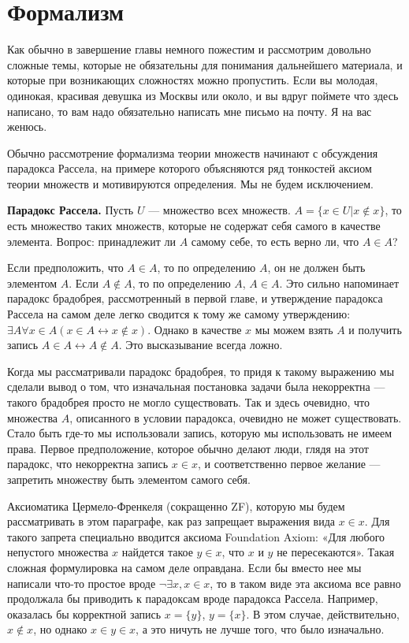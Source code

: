 \section{Формализм}

Как обычно в завершение главы немного пожестим и рассмотрим довольно сложные темы, которые не обязательны для понимания дальнейшего материала, и которые при возникающих сложностях можно пропустить. Если вы молодая, одинокая, красивая девушка из Москвы или около, и вы вдруг поймете что здесь написано, то вам надо обязательно написать мне письмо на почту. Я на вас женюсь.

Обычно рассмотрение формализма теории множеств начинают с обсуждения парадокса Рассела, на примере которого объясняются ряд тонкостей аксиом теории множеств и мотивируются определения. Мы не будем исключением.

{\bfseries Парадокс Рассела.} Пусть $U$ — множество всех множеств. $A = \{x\in U|x\not\in x\}$, то есть множество таких множеств, которые не содержат себя самого в качестве элемента. Вопрос: принадлежит ли $A$ самому себе, то есть верно ли, что $A\in A$?

Если предположить, что $A\in A$, то по определению $A$, он не должен быть элементом $A$. Если $A\not\in A$, то по определению $A$, $A \in A$. Это сильно напоминает парадокс брадобрея, рассмотренный в первой главе, и утверждение парадокса Рассела на самом деле легко сводится к тому же самому утверждению: $\exists A\forall x\in A (x\in A \leftrightarrow x\not\in x)$. Однако в качестве $x$ мы можем взять $A$ и получить запись $A\in A \leftrightarrow A\not\in A$. Это высказывание всегда ложно.

Когда мы рассматривали парадокс брадобрея, то придя к такому выражению мы сделали вывод о том, что изначальная постановка задачи была некорректна — такого брадобрея просто не могло существовать. Так и здесь очевидно, что множества $A$, описанного в условии парадокса, очевидно не может существовать. Стало быть где-то мы использовали запись, которую мы использовать не имеем права. Первое предположение, которое обычно делают люди, глядя на этот парадокс, что некорректна запись $x\in x$, и соответственно первое желание — запретить множеству быть элементом самого себя.

Аксиоматика Цермело-Френкеля (сокращенно ZF), которую мы будем рассматривать в этом параграфе, как раз запрещает выражения вида $x\in x$. Для такого запрета специально вводится аксиома Foundation Axiom: «Для любого непустого множества $x$ найдется такое $y\in x$, что $x$ и $y$ не пересекаются». Такая сложная формулировка на самом деле оправдана. Если бы вместо нее мы написали что-то простое вроде $\neg \exists x, x\in x$, то в таком виде эта аксиома все равно продолжала бы приводить к парадоксам вроде парадокса Рассела. Например, оказалась бы корректной запись $x=\{y\}$, $y=\{x\}$. В этом случае, действительно, $x\not\in x$, но однако $x\in y\in x$, а это ничуть не лучше того, что было изначально.


